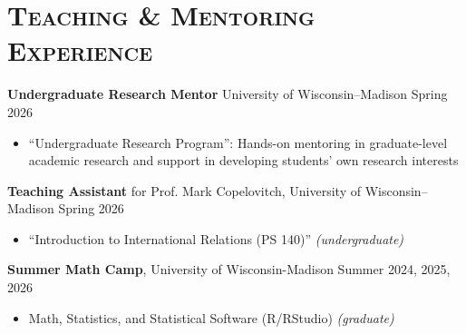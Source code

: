 \documentclass[11pt, letterpaper]{article}
\begin{document}


\vspace{-6mm}
\section*{\textsc{Teaching \& Mentoring Experience}}

\vspace{-1mm}
\textbf{Undergraduate Research Mentor} University of Wisconsin--Madison
\hfill Spring 2026
\vspace{-2mm}
\begin{itemize}
    \item ``Undergraduate Research Program'': Hands-on mentoring in graduate-level academic research and support in developing students’ own research interests
\end{itemize}

\vspace{-1mm}
\textbf{Teaching Assistant} for Prof. Mark Copelovitch, University of Wisconsin--Madison
\hfill Spring 2026\\
\vspace{-7mm}
\begin{itemize}
    \item ``Introduction to International Relations (PS 140)'' \textit{(undergraduate)}
\end{itemize}

\vspace{-2mm}
\textbf{Summer Math Camp}, University of Wisconsin-Madison
\hfill Summer 2024, 2025, 2026\\
\vspace{-7mm}
\begin{itemize}
    \item Math, Statistics, and Statistical Software (R/RStudio) \textit{(graduate)}
\end{itemize}
\end{document}
